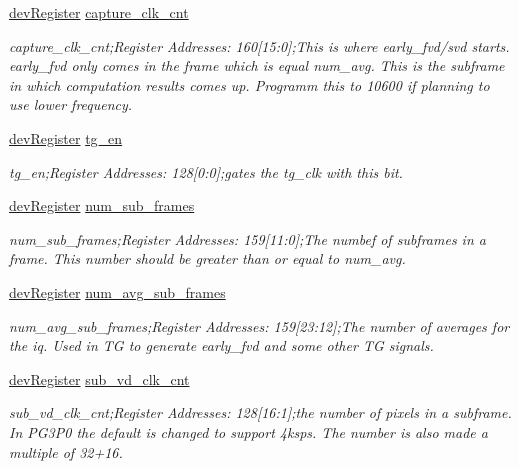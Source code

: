 \begin{DoxyCompactItemize}
\mbox{\hyperlink{classdev_register}{dev\+Register}} \mbox{\hyperlink{class_o_p_t3101_registers_a5e058ae7244daa3be323daa3282b8171}{capture\+\_\+clk\+\_\+cnt}}
\begin{DoxyCompactList}\small\item\em capture\+\_\+clk\+\_\+cnt;Register Addresses\+: 160\mbox{[}15\+:0\mbox{]};This is where early\+\_\+fvd/svd starts. early\+\_\+fvd only comes in the frame which is equal num\+\_\+avg. This is the subframe in which computation results comes up. Programm this to 10600 if planning to use lower frequency. \end{DoxyCompactList}\item 
\mbox{\hyperlink{classdev_register}{dev\+Register}} \mbox{\hyperlink{class_o_p_t3101_registers_a5cb9d7749b80772a5c786912eaf1db91}{tg\+\_\+en}}
\begin{DoxyCompactList}\small\item\em tg\+\_\+en;Register Addresses\+: 128\mbox{[}0\+:0\mbox{]};gates the tg\+\_\+clk with this bit. \end{DoxyCompactList}\item 
\mbox{\hyperlink{classdev_register}{dev\+Register}} \mbox{\hyperlink{class_o_p_t3101_registers_ad50dd2b7c80d3da45925f0e510c22a99}{num\+\_\+sub\+\_\+frames}}
\begin{DoxyCompactList}\small\item\em num\+\_\+sub\+\_\+frames;Register Addresses\+: 159\mbox{[}11\+:0\mbox{]};The numbef of subframes in a frame. This number should be greater than or equal to num\+\_\+avg. \end{DoxyCompactList}\item 
\mbox{\hyperlink{classdev_register}{dev\+Register}} \mbox{\hyperlink{class_o_p_t3101_registers_a4421cd64388f2af7ffcf6fe52e74a06a}{num\+\_\+avg\+\_\+sub\+\_\+frames}}
\begin{DoxyCompactList}\small\item\em num\+\_\+avg\+\_\+sub\+\_\+frames;Register Addresses\+: 159\mbox{[}23\+:12\mbox{]};The number of averages for the iq. Used in TG to generate early\+\_\+fvd and some other TG signals. \end{DoxyCompactList}\item 
\mbox{\hyperlink{classdev_register}{dev\+Register}} \mbox{\hyperlink{class_o_p_t3101_registers_a25b67733b0c9dc171f8bc2893d1b99bb}{sub\+\_\+vd\+\_\+clk\+\_\+cnt}}
\begin{DoxyCompactList}\small\item\em sub\+\_\+vd\+\_\+clk\+\_\+cnt;Register Addresses\+: 128\mbox{[}16\+:1\mbox{]};the number of pixels in a subframe. In P\+G3\+P0 the default is changed to support 4ksps. The number is also made a multiple of 32+16. \end{DoxyCompactList}\item 

\end{DoxyCompactItemize}
